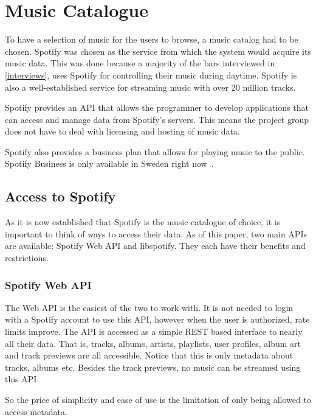\section{Music Catalogue}
\label{sec:Music_catalog}
To have a selection of music for the users to browse, a music catalog had to be chosen. Spotify was chosen as the service from which the system would acquire its music data. This was done because a majority of the bars interviewed in \cref{interviews}, uses Spotify for controlling their music during daytime. Spotify is also a well-established service for streaming music with over 20 million tracks.

Spotify provides an API that allows the programmer to develop applications that can access and manage data from Spotify’s servers. This means the project group does not have to deal with licensing and hosting of music data.

Spotify also provides a business plan that allows for playing music to the public. Spotify Business is only available in Sweden right now~\cite{spotifyBusiness}.

\subsection{Access to Spotify}
\label{sub:Access_to_Spotify}

As it is now established that Spotify is the music catalogue of choice, it is important to think of ways to access their data. As of this paper, two main APIs are available: Spotify Web API and libspotify. They each have their benefits and restrictions.

\subsubsection{Spotify Web API}
\label{ssub:spotify_web_api}

The Web API is the easiest of the two to work with. It is not needed to login with a Spotify account to use this API, however when the user is authorized, rate limits improve. The API is accessed as a simple REST based interface to nearly all their data. That is, tracks, albums, artists, playlists, user profiles, album art and track previews are all accessible. Notice that this is only metadata about tracks, albums etc. Besides the track previews, no music can be streamed using this API.

So the price of simplicity and ease of use is the limitation of only being allowed to access metadata.

